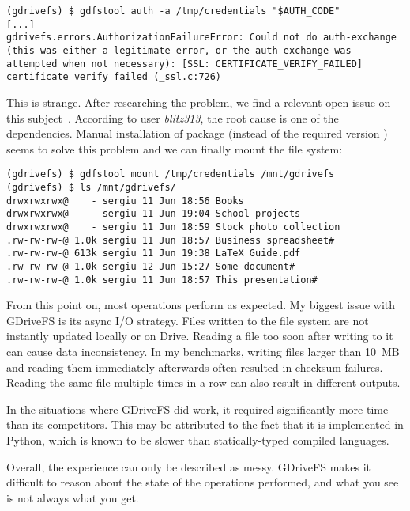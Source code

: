 \begin{lstlisting}[frame=single,caption=GDriveFS authentication error]
(gdrivefs) $ gdfstool auth -a /tmp/credentials "$AUTH_CODE"
[...]
gdrivefs.errors.AuthorizationFailureError: Could not do auth-exchange (this was either a legitimate error, or the auth-exchange was attempted when not necessary): [SSL: CERTIFICATE_VERIFY_FAILED] certificate verify failed (_ssl.c:726)
\end{lstlisting}

This is strange. After researching the problem, we find a relevant open issue on this subject~\cite{gdrivefs_ssl_handshake_error}. According to user \emph{blitz313}, the root cause is one of the dependencies. Manual installation of package  (instead of the required version ) seems to solve this problem and we can finally mount the file system:

\begin{lstlisting}[frame=single,caption=GDriveFS filesystem mount]
(gdrivefs) $ gdfstool mount /tmp/credentials /mnt/gdrivefs
(gdrivefs) $ ls /mnt/gdrivefs/
drwxrwxrwx@    - sergiu 11 Jun 18:56 Books
drwxrwxrwx@    - sergiu 11 Jun 19:04 School projects
drwxrwxrwx@    - sergiu 11 Jun 18:59 Stock photo collection
.rw-rw-rw-@ 1.0k sergiu 11 Jun 18:57 Business spreadsheet#
.rw-rw-rw-@ 613k sergiu 11 Jun 19:38 LaTeX Guide.pdf
.rw-rw-rw-@ 1.0k sergiu 12 Jun 15:27 Some document#
.rw-rw-rw-@ 1.0k sergiu 11 Jun 18:57 This presentation#
\end{lstlisting}

From this point on, most operations perform as expected. My biggest issue with GDriveFS is its async I/O strategy. Files written to the file system are not instantly updated locally or on Drive. Reading a file too soon after writing to it can cause data inconsistency. In my benchmarks, writing files larger than \mbox{10 MB} and reading them immediately afterwards often resulted in checksum failures. Reading the same file multiple times in a row can also result in different outputs.

In the situations where GDriveFS did work, it required significantly more time than its competitors. This may be attributed to the fact that it is implemented in Python, which is known to be slower than statically-typed compiled languages.

Overall, the experience can only be described as messy. GDriveFS makes it difficult to reason about the state of the operations performed, and what you see is not always what you get.

